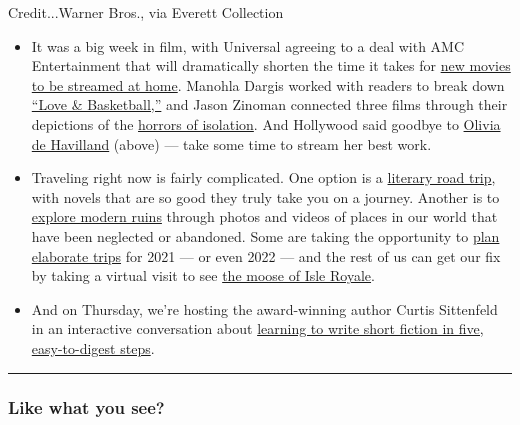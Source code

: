 Credit...Warner Bros., via Everett Collection

\begin{itemize}
\item
  It was a big week in film, with Universal agreeing to a deal with AMC
  Entertainment that will dramatically shorten the time it takes for
  \href{https://www.nytimes.com/2020/07/28/business/media/universal-amc-movies-at-home.html}{new
  movies to be streamed at home}. Manohla Dargis worked with readers to
  break down
  \href{https://www.nytimes.com/2020/07/28/movies/love-basketball-viewing-party.html}{``Love
  \& Basketball,''} and Jason Zinoman connected three films through
  their depictions of the
  \href{https://www.nytimes.com/2020/07/29/movies/horror-she-dies-tomorrow-relic-amulet.html}{horrors
  of isolation}. And Hollywood said goodbye to
  \href{https://www.nytimes.com/2020/07/26/arts/olivia-de-havilland-movies-stream.html}{Olivia
  de Havilland} (above) --- take some time to stream her best work.
\item
  Traveling right now is fairly complicated. One option is a
  \href{https://www.nytimes.com/2020/07/28/books/time-for-a-literary-road-trip.html}{literary
  road trip}, with novels that are so good they truly take you on a
  journey. Another is to
  \href{https://www.nytimes.com/2020/07/27/us/abandoned-properties-to-explore.html}{explore
  modern ruins} through photos and videos of places in our world that
  have been neglected or abandoned. Some are taking the opportunity to
  \href{https://www.nytimes.com/2020/07/28/travel/future-travel-bucket-list-coronavirus.html}{plan
  elaborate trips} for 2021 --- or even 2022 --- and the rest of us can
  get our fix by taking a virtual visit to see
  \href{https://www.nytimes.com/2020/07/27/travel/moose-michigan-isle-royale.html}{the
  moose of Isle Royale}.
\item
  And on Thursday, we're hosting the award-winning author Curtis
  Sittenfeld in an interactive conversation about
  \href{https://timesevents.nytimes.com/astorywritingclasswithcurtissittenfeld/newsletter}{learning
  to write short fiction in five, easy-to-digest steps}.
\end{itemize}

\begin{center}\rule{0.5\linewidth}{\linethickness}\end{center}

\hypertarget{like-what-you-see}{%
\subsubsection{Like what you see?}\label{like-what-you-see}}

